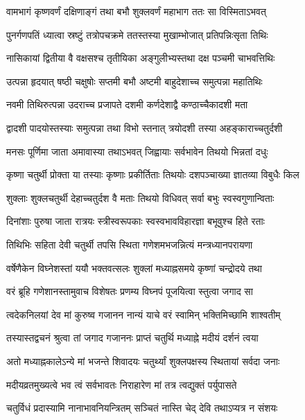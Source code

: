 \twolineshloka
{वामभागं कृष्णवर्णं दक्षिणाङ्गं तथा बभौ}
{शुक्लवर्णं महाभाग ततः सा विस्मिताऽभवत्} %

\twolineshloka
{पुनर्गणपतिं ध्यात्वा स्रष्टुं तत्रोपचक्रमे}
{ततस्तस्या मुखाम्भोजात् प्रतिपन्निःसृता तिथिः} %

\twolineshloka
{नासिकायां द्वितीया वै वक्षसश्च तृतीयिका}
{अङ्गुलीभ्यस्तथा दक्ष पञ्चमी चाभवत्तिथिः} %

\twolineshloka
{उत्पन्ना हृदयात् षष्ठी चक्षुषोः सप्तमी बभौ}
{अष्टमी बाहुदेशाच्च समुत्पन्ना महातिथिः} %

\twolineshloka
{नवमी तिथिरुत्पन्ना उदराच्च प्रजापते}
{दशमी कर्णदेशाद्वै कण्ठाच्चैकादशी मता} %

\twolineshloka
{द्वादशी पादयोस्तस्याः समुत्पन्ना तथा विभो}
{स्तनात् त्रयोदशी तस्या अहङ्काराच्चतुर्दशी} %

\twolineshloka
{मनसः पूर्णिमा जाता अमावास्या तथाऽभवत्}
{जिह्वायाः सर्वभावेन तिथयो भिन्नतां दधुः} %

\twolineshloka
{कृष्णा चतुर्थी प्रोक्ता या तस्याः कृष्णाः प्रकीर्तिताः}
{तिथयोः दशपञ्चाख्या ज्ञातव्या विबुधैः किल} %

\twolineshloka
{शुक्लाः शुक्लचतुर्थी देहाच्चतुर्दश वै मताः}
{तिथयो विधिवत् सर्वा बभुः स्वस्वगुणान्विताः} %

\twolineshloka
{दिनांशाः पुरुषा जाता रात्रयः स्त्रीस्वरूपकाः}
{स्वस्वभावविहारज्ञा बभूवुश्च हिते रताः} %

\twolineshloka
{तिथिभिः सहिता देवी चतुर्थी तपसि स्थिता}
{गणेशमभजन्नित्यं मन्त्रध्यानपरायणा} %

\twolineshloka
{वर्षेणैकेन विघ्नेशस्तां ययौ भक्तवत्सलः}
{शुक्लां मध्याह्नसमये कृष्णां चन्द्रोदये तथा} %

\twolineshloka
{वरं ब्रूहि गणेशानस्तामुवाच विशेषतः}
{प्रणम्य विघ्नपं पूजयित्वा स्तुत्वा जगाद सा} %


\twolineshloka
{त्वदेकनिलयां देव मां कुरुष्व गजानन}
{नान्यं याचे वरं स्वामिन् भक्तिमिच्छामि शाश्वतीम्} %

\twolineshloka
{तस्यास्तद्वचनं श्रुत्वा तां जगाद गजाननः}
{प्राप्तं चतुर्थि मध्याह्ने मदीयं दर्शनं त्वया} %

\twolineshloka
{अतो मध्याह्नकालेऽन्ये मां भजन्ते शिवादयः}
{चतुर्थ्यां शुक्लपक्षस्य स्थितायां सर्वदा जनाः} %

\twolineshloka
{मदीयव्रतमुख्यत्वे भव त्वं सर्वभावतः}
{निराहारेण मां तत्र त्वद्युक्तं पर्युपासते} %

\twolineshloka
{चतुर्विधं प्रदास्यामि नानाभावनियन्त्रितम्}
{सञ्चितं नास्ति चेद् देवि तथाऽप्यत्र न संशयः} %

